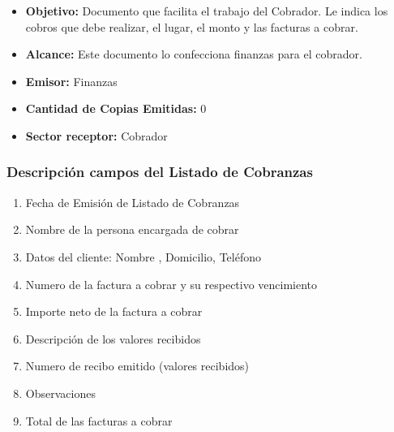 \begin{itemize}
  \item \textbf{Objetivo:} Documento que facilita el trabajo del Cobrador. Le indica los cobros que debe realizar, el lugar, el monto y las facturas a cobrar.
  \item \textbf{Alcance:} Este documento lo confecciona finanzas para el cobrador.
  \item \textbf{Emisor:} Finanzas
  \item \textbf{Cantidad de Copias Emitidas:} 0
  \item \textbf{Sector receptor:} Cobrador
 \end{itemize}
 
\subsubsection{Descripci\'on campos del Listado de Cobranzas}
\begin{enumerate}
\item Fecha de Emisión de Listado de Cobranzas
\item Nombre de la persona encargada de cobrar
\item Datos del cliente: Nombre , Domicilio, Teléfono
\item Numero de la factura a cobrar y su respectivo vencimiento
\item Importe neto de la factura a cobrar
\item Descripción de los valores recibidos
\item Numero de recibo emitido (valores recibidos)
\item Observaciones
\item Total de las facturas a cobrar
\end{enumerate}

\pagebreak
